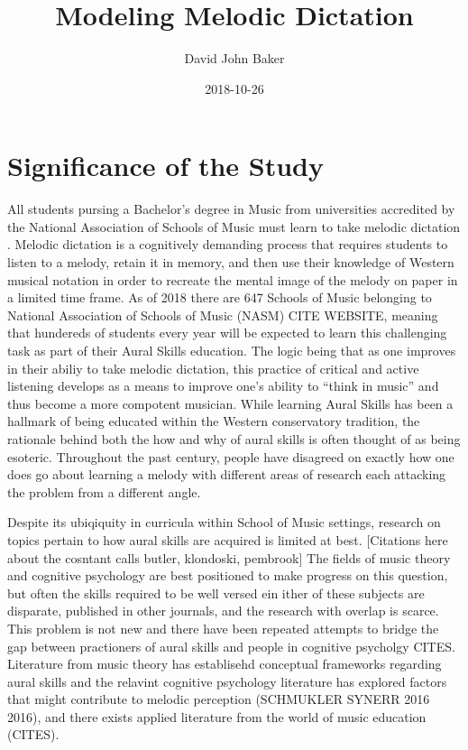 \documentclass[]{book}
\title{Modeling Melodic Dictation}
\author{David John Baker}
\date{2018-10-26}
\theoremstyle{definition}
\theoremstyle{definition}
\theoremstyle{definition}
\theoremstyle{remark}
\begin{document}
\maketitle

{
\setcounter{tocdepth}{1}
\tableofcontents
}
\hypertarget{significance-of-the-study}{%
\chapter{Significance of the Study}\label{significance-of-the-study}}

All students pursing a Bachelor's degree in Music from universities
accredited by the National Association of Schools of Music must learn to
take melodic dictation \citep[ Section
VIII.6.B.2.A]{NationalAssociationSchools2018}. Melodic dictation is a
cognitively demanding process that requires students to listen to a
melody, retain it in memory, and then use their knowledge of Western
musical notation in order to recreate the mental image of the melody on
paper in a limited time frame. As of 2018 there are 647 Schools of Music
belonging to National Association of Schools of Music (NASM) CITE
WEBSITE, meaning that hundereds of students every year will be expected
to learn this challenging task as part of their Aural Skills education.
The logic being that as one improves in their abiliy to take melodic
dictation, this practice of critical and active listening develops as a
means to improve one's ability to ``think in music'' and thus become a
more compotent musician. While learning Aural Skills has been a hallmark
of being educated within the Western conservatory tradition, the
rationale behind both the how and why of aural skills is often thought
of as being esoteric. Throughout the past century, people have disagreed
on exactly how one does go about learning a melody with different areas
of research each attacking the problem from a different angle.

Despite its ubiqiquity in curricula within School of Music settings,
research on topics pertain to how aural skills are acquired is limited
at best. {[}Citations here about the cosntant calls butler, klondoski,
pembrook{]} The fields of music theory and cognitive psychology are best
positioned to make progress on this question, but often the skills
required to be well versed ein ither of these subjects are disparate,
published in other journals, and the research with overlap is scarce.
This problem is not new and there have been repeated attempts to bridge
the gap between practioners of aural skills and people in cognitive
psycholgy CITES. Literature from music theory has establisehd conceptual
frameworks regarding aural skills
\citet{karpinskiAuralSkillsAcquisition2000} and the relavint cognitive
psychology literature has explored factors that might contribute to
melodic perception (SCHMUKLER SYNERR 2016 2016), and there exists
applied literature from the world of music education (CITES).
\end{document}
